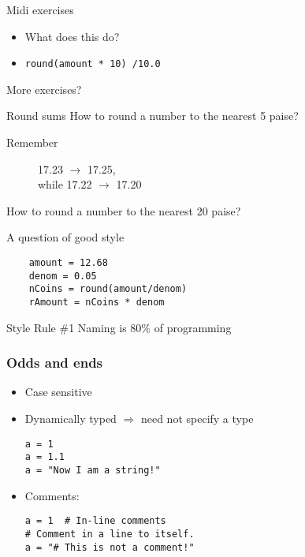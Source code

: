 \documentclass[14pt,compress]{beamer}
\newcounter{time}
\newcommand{\inctime}[1]{\addtocounter{time}{#1}{\tiny \thetime\ m}}
\begin{document}
\begin{frame}{Midi exercises}
  \begin{center}
    \begin{itemize}
      \item What does this do?
      \item \texttt{round(amount * 10) /10.0 }
    \end{itemize}
  \end{center}
\end{frame}

\begin{frame}{More exercises?}
  \begin{center}
    \begin{block}{Round sums}
      How to round a number to the nearest  5 paise?\\
      \begin{description}
        \item[Remember] 17.23 $\rightarrow$ 17.25,\\ while 17.22 $\rightarrow$ 17.20\\
      \end{description}
      How to round a number to the nearest 20 paise?
    \end{block}
  \end{center}
\end{frame}

\begin{frame}[fragile] {A question of good style}
  \begin{lstlisting}
    amount = 12.68
    denom = 0.05
    nCoins = round(amount/denom)
    rAmount = nCoins * denom
  \end{lstlisting}
  \pause
  \begin{block}{Style Rule \#1}
    Naming is 80\% of programming
  \end{block}
\end{frame}


\begin{frame}[fragile]
  \frametitle{Odds and ends}
  \begin{itemize}
    \item Case sensitive
    \item Dynamically typed $\Rightarrow$ need not specify a type
      \begin{lstlisting}
a = 1
a = 1.1
a = "Now I am a string!"
      \end{lstlisting}
    \item Comments:
      \begin{lstlisting}
a = 1  # In-line comments
# Comment in a line to itself.
a = "# This is not a comment!"
      \end{lstlisting}
  \end{itemize}
  \inctime{15}
\end{frame}
\end{document}
